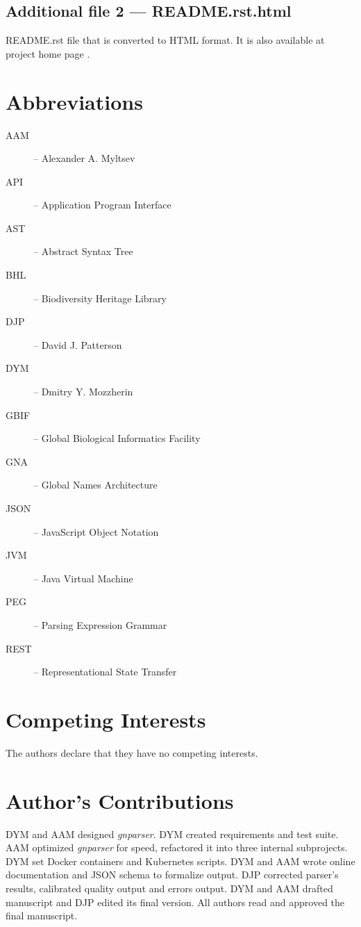 \documentclass{bmcart}
\begin{document}
  \subsection*{Additional file 2 --- README.rst.html}
  README.rst file that is converted to HTML format. It is also available at
  project home page \cite{gnparser}.

\section*{Abbreviations}

\begin{description}
  \item[AAM] -- Alexander A. Myltsev
  \item[API] -- Application Program Interface
  \item[AST] -- Abstract Syntax Tree
  \item[BHL] -- Biodiversity Heritage Library
  \item[DJP] -- David J. Patterson
  \item[DYM] -- Dmitry Y. Mozzherin
  \item[GBIF] -- Global Biological Informatics Facility
  \item[GNA] -- Global Names Architecture
  \item[JSON] -- JavaScript Object Notation
  \item[JVM] -- Java Virtual Machine
  \item[PEG] -- Parsing Expression Grammar
  \item[REST] -- Representational State Transfer
\end{description}

\section*{Competing Interests}

The authors declare that they have no competing interests.

\section*{Author's Contributions}

DYM and AAM designed \textit{gnparser}. DYM created requirements and test
suite. AAM optimized \textit{gnparser} for speed, refactored it into three
internal subprojects.  DYM set Docker containers and Kubernetes scripts. DYM
and AAM wrote online documentation and JSON schema to formalize output. DJP
corrected parser's results, calibrated quality output and errors output. DYM
and AAM drafted manuscript and DJP edited its final version. All authors read
and approved the final manuscript.
\end{document}

